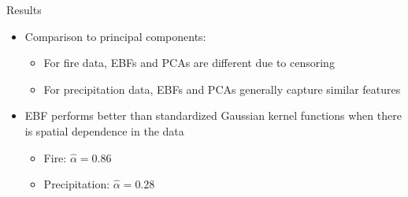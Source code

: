 \documentclass{beamer}
\begin{document}
\begin{frame}{Results}
	\begin{itemize} \setlength{\itemsep}{1em}
    \item Comparison to principal components: \vspace{0.5em}
    \begin{itemize} \setlength{\itemsep}{0.5em}
		  \item For fire data, EBFs and PCAs are different due to censoring
		  \item For precipitation data, EBFs and PCAs generally capture similar features
    \end{itemize}
		\item EBF performs better than standardized Gaussian kernel functions when there is spatial dependence in the data \vspace{0.5em}
    \begin{itemize} \setlength{\itemsep}{0.5em}
      \item Fire: $\hat{\alpha} = 0.86$
      \item Precipitation: $\hat{\alpha} = 0.28$
    \end{itemize}
	\end{itemize}
\end{frame}

%
\end{document}
